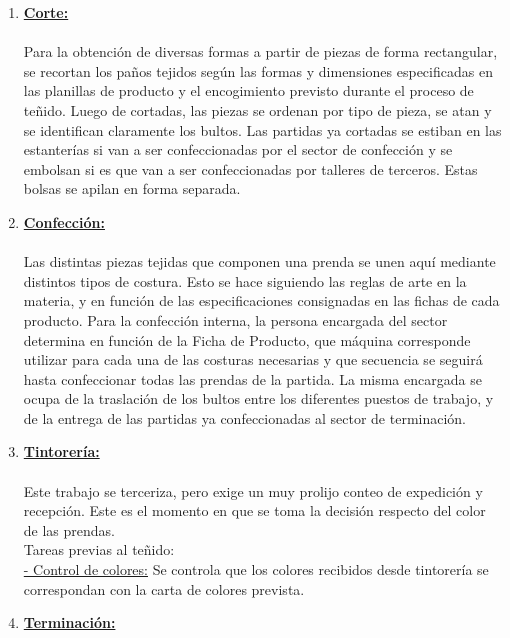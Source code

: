 \documentclass[a4paper,10pt,titlepage]{article}
\begin{document}
\begin{enumerate}
\begin{itemize}
				\end{itemize}
			\item \textbf{\underline{Corte:}}\\\\
			\indent Para la obtenci\'on de diversas formas a partir de piezas de forma rectangular, se recortan los paños tejidos seg\'un las formas y dimensiones especificadas en las planillas de producto y el encogimiento previsto durante el proceso de teñido. Luego de cortadas, las piezas se ordenan por tipo de pieza, se atan y se identifican claramente los bultos. Las partidas ya cortadas se estiban en las estanter\'ias si van a ser confeccionadas por el sector de confecci\'on y se embolsan si es que van a ser confeccionadas por talleres de terceros. Estas bolsas se apilan en forma separada.\\
			\item \textbf{\underline{Confecci\'on:}}\\\\
			\indent Las distintas piezas tejidas que componen una prenda se unen aqu\'i mediante distintos tipos de costura. Esto se hace siguiendo las reglas de arte en la materia, y en funci\'on de las especificaciones consignadas en las fichas de cada producto. Para la confecci\'on interna, la persona encargada del sector determina en funci\'on de la Ficha de Producto, que m\'aquina corresponde utilizar para cada una de las costuras necesarias y que secuencia se seguir\'a hasta confeccionar todas las prendas de la partida. La misma encargada se ocupa de la traslaci\'on de los bultos entre los diferentes puestos de trabajo, y de la entrega de las partidas ya confeccionadas al sector de terminaci\'on.\\
			\item \textbf{\underline{Tintorer\'ia:}}\\\\
			\indent Este trabajo se terceriza, pero exige un muy prolijo conteo de expedici\'on y recepci\'on. Este es el momento en que se toma la decisi\'on respecto del color de las prendas.\\
			\indent Tareas previas al teñido:\\
			\indent \underline{ - Control de colores:} Se controla que los colores recibidos desde tintorer\'ia se correspondan con la carta de colores prevista.\\
			\item \textbf{\underline{Terminaci\'on:}}\\\\

\end{enumerate}
\end{document}
